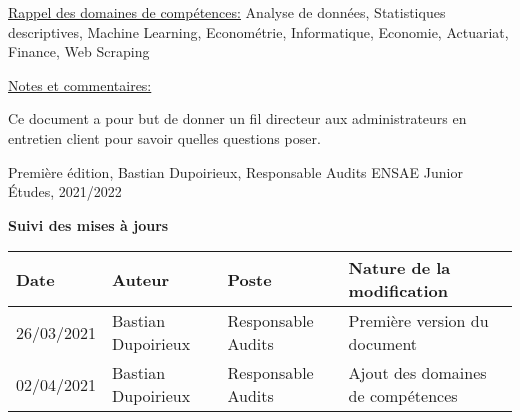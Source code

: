 \documentclass[12pt]{article}
\begin{document}
\vspace{6cm}

\footnotesize \underline{Rappel des domaines de compétences:} Analyse de données, Statistiques descriptives, Machine Learning, Econométrie, Informatique, Economie, Actuariat, Finance, Web Scraping



\large{\underline{Notes et commentaires:}}


\newpage


\Large{Ce document a pour but de donner un fil directeur aux administrateurs en entretien client pour savoir quelles questions poser.}

\bigskip

\large{Première édition, Bastian Dupoirieux, Responsable Audits ENSAE Junior Études, 2021/2022}


\bigskip

\textcolor{rouge_eje}{\textbf{Suivi des mises à jours}}

\begin{center}

\begin{tabular}{|p{2.5cm}|p{5cm}|p{5cm}|p{5cm}|}
\hline
Date & Auteur & Poste & Nature de la modification \\
\hline
26/03/2021 & Bastian Dupoirieux & Responsable Audits& Première version du document \\
\hline
02/04/2021 & Bastian Dupoirieux & Responsable Audits & Ajout des domaines de compétences\\
\hline

\end{tabular}
\end{center}
\end{document}
